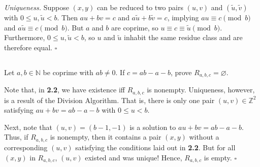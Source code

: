 \documentclass{article}
\newcommand{\N}{\mathbb{N}}
\newcommand{\Z}{\mathbb{Z}}
\begin{document}
  \textit{Uniqueness.}
  Suppose $(x,y)$ can be reduced to two pairs $(u,v)$ and $(\tilde{u},
  \tilde{v})$ with $0\leq u,\tilde{u}<b$. Then $au+bv=c$ and $a\tilde{u}+b
  \tilde{v}=c$, implying $au\equiv c\pmod{b}$ and $a\tilde{u}\equiv c\pmod{b}$.
  But $a$ and $b$ are coprime, so $u\equiv c\equiv\tilde{u}\pmod{b}$.
  Furthermore, $0\leq u,\tilde{u}<b$, so $u$ and $\tilde{u}$ inhabit the same
  residue class and are therefore equal.
  \hfill $\square$

\subsection{} %
  Let $a,b\in\N$ be coprime with $ab\ne0$. If $c=ab-a-b$, prove $R_{a,b,c}=
  \varnothing$.

  Note that, in \textbf{2.2}, we have existence iff $R_{a,b,c}$ is nonempty.
  Uniqueness, however, is a result of the Division Algorithm. That is, there is
  only one pair $(u,v)\in\Z^2$ satisfying $au+bv=ab-a-b$ with $0\leq u<b$.

  Next, note that $(u,v)=(b-1,-1)$ is a solution to $au+bv=ab-a-b$. Thus, if
  $R_{a,b,c}$ is nonempty, then it contains a pair $(x,y)$ without a
  corresponding $(u,v)$ satisfying the conditions laid out in \textbf{2.2}. But
  for all $(x,y)$ in $R_{a,b,c}$, $(u,v)$ existed and was unique! Hence,
  $R_{a,b,c}$ is empty.
  \hfill $\square$

\subsection{} %
\subsection{} %
\subsection{} %
\end{document}
